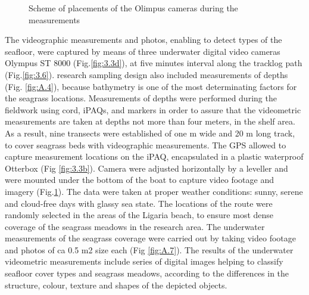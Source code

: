 \documentclass[10pt, a4paper]{article}
\begin{document}
\begin{figure}[H]
	\centering
	\caption{Scheme of placements of the Olimpus cameras during the measurements}
	\label{fig:3.5}
\end{figure}

The videographic measurements and photos, enabling to detect types of the
seafloor, were captured by means of three underwater digital video cameras Olympus ST 8000  (Fig.\ref{fig:3.3d}), at
five minutes interval along the tracklog path (Fig.\ref{fig:3.6}).
research sampling design also included measurements of depths (Fig. \ref{fig:A.4}), because bathymetry is one of the
most determinating factors for the seagrass locations. Measurements of depths were performed during
the fieldwork using cord, iPAQs, and markers in order to assure that the videometric measurements
are taken at depths not more than four meters, in the shelf area.
As a result, nine transects were established of one m wide and 20 m long track, to cover seagrass beds
with videographic measurements. The GPS allowed to capture measurement locations on the iPAQ,
encapsulated in a plastic waterproof Otterbox (Fig \ref{fig:3.3b}). Camera were adjusted horizontally by a leveller and
were mounted under the bottom of the boat to capture video footage and imagery (Fig.\ref{fig:3.5}). The data
were taken at proper weather conditions: sunny, serene and cloud-free days with glassy sea state. The
locations of the route were randomly selected in the areas of the Ligaria beach, to ensure most dense
coverage of the seagrass meadows in the research area. The underwater measurements of the seagrass
coverage were carried out by taking video footage and photos of ca 0.5 m2 size each (Fig \ref{fig:A.7}).
The results of the underwater videometric measurements include series of digital images helping to
classify seafloor cover types and seagrass meadows, according to the differences in the structure,
colour, texture and shapes of the depicted objects.
\end{document}
